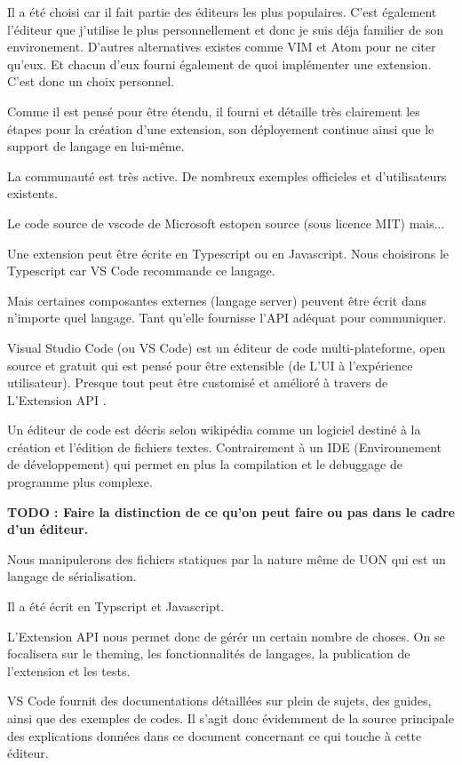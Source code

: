 \documentclass[
    iict, %
    il, %
]{heig-tb}
\begin{document}
Il a été choisi car il fait partie des éditeurs les plus populaires. C'est également l'éditeur que j'utilise le plus personnellement et donc je suis déja familier de son environement.
D'autres alternatives existes comme VIM et Atom pour ne citer qu'eux. Et chacun d'eux fourni également de quoi implémenter une extension.
C'est donc un choix personnel.

Comme il est pensé pour être étendu, il fourni et détaille très clairement les étapes pour la création d'une extension, son déployement continue ainsi que le support de langage en lui-même.

La communauté est très active.
De nombreux exemples officieles et d'utilisateurs existents.

Le code source de vscode de Microsoft estopen source (sous licence MIT) mais...

Une extension peut être écrite en Typescript ou en Javascript.
Nous choisirons le Typescript car VS Code recommande ce langage.

Mais certaines composantes externes (langage server) peuvent être écrit dans n'importe quel langage. Tant qu'elle fournisse l'API adéquat pour communiquer.


Visual Studio Code (ou VS Code) est un éditeur de code multi-plateforme, open source et gratuit qui est pensé pour être extensible (de L'UI à l'expérience utilisateur).
Presque tout peut être customisé et amélioré à travers de L'Extension API \cite{extension-api}.


Un éditeur de code est décris selon wikipédia comme un logiciel destiné à la création et l'édition de fichiers textes.
Contrairement à un IDE (Environnement de développement) qui permet en plus la compilation et le debuggage de programme plus complexe.

\textbf{TODO : Faire la distinction de ce qu'on peut faire ou pas dans le cadre d'un éditeur.}

Nous manipulerons des fichiers statiques par la nature même de UON qui est un langage de sérialisation.

Il a été écrit en Typscript et Javascript.

L'Extension API nous permet donc de gérér un certain nombre de choses.
On se focalisera sur le theming, les fonctionnalités de langages, la publication de l'extension et les tests.

VS Code fournit des documentations détaillées sur plein de sujets, des guides, ainsi que des exemples de codes.
Il s'agit donc évidemment de la source principale des explications données dans ce document concernant ce qui touche à cette éditeur.
\end{document}

